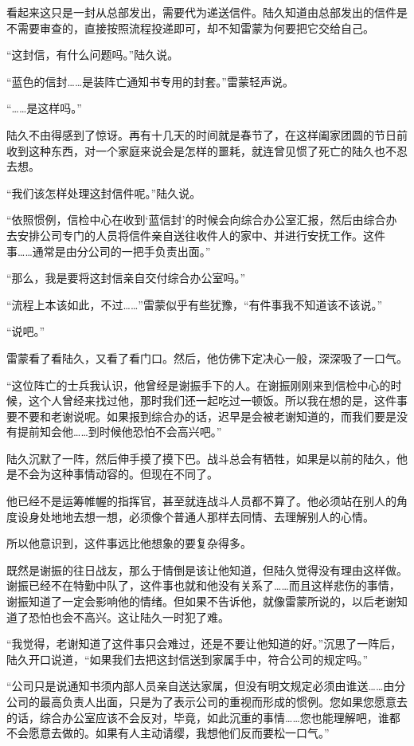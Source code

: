 看起来这只是一封从总部发出，需要代为递送信件。陆久知道由总部发出的信件是不需要审查的，直接按照流程投递即可，却不知雷蒙为何要把它交给自己。

“这封信，有什么问题吗。”陆久说。

“蓝色的信封……是装阵亡通知书专用的封套。”雷蒙轻声说。

“……是这样吗。”

陆久不由得感到了惊讶。再有十几天的时间就是春节了，在这样阖家团圆的节日前收到这种东西，对一个家庭来说会是怎样的噩耗，就连曾见惯了死亡的陆久也不忍去想。

“我们该怎样处理这封信件呢。”陆久说。

“依照惯例，信检中心在收到‘蓝信封’的时候会向综合办公室汇报，然后由综合办去安排公司专门的人员将信件亲自送往收件人的家中、并进行安抚工作。这件事……通常是由分公司的一把手负责出面。”

“那么，我是要将这封信亲自交付综合办公室吗。”

“流程上本该如此，不过……”雷蒙似乎有些犹豫，“有件事我不知道该不该说。”

“说吧。”

雷蒙看了看陆久，又看了看门口。然后，他仿佛下定决心一般，深深吸了一口气。

“这位阵亡的士兵我认识，他曾经是谢振手下的人。在谢振刚刚来到信检中心的时候，这个人曾经来找过他，那时我们还一起吃过一顿饭。所以我在想的是，这件事要不要和老谢说呢。如果报到综合办的话，迟早是会被老谢知道的，而我们要是没有提前知会他……到时候他恐怕不会高兴吧。”

陆久沉默了一阵，然后伸手摸了摸下巴。战斗总会有牺牲，如果是以前的陆久，他是不会为这种事情动容的。但现在不同了。

他已经不是运筹帷幄的指挥官，甚至就连战斗人员都不算了。他必须站在别人的角度设身处地地去想一想，必须像个普通人那样去同情、去理解别人的心情。

所以他意识到，这件事远比他想象的要复杂得多。

既然是谢振的往日战友，那么于情倒是该让他知道，但陆久觉得没有理由这样做。谢振已经不在特勤中队了，这件事也就和他没有关系了……而且这样悲伤的事情，谢振知道了一定会影响他的情绪。但如果不告诉他，就像雷蒙所说的，以后老谢知道了恐怕也会不高兴。这让陆久一时犯了难。

“我觉得，老谢知道了这件事只会难过，还是不要让他知道的好。”沉思了一阵后，陆久开口说道，“如果我们去把这封信送到家属手中，符合公司的规定吗。”

“公司只是说通知书须内部人员亲自送达家属，但没有明文规定必须由谁送……由分公司的最高负责人出面，只是为了表示公司的重视而形成的惯例。您如果您愿意去的话，综合办公室应该不会反对，毕竟，如此沉重的事情……您也能理解吧，谁都不会愿意去做的。如果有人主动请缨，我想他们反而要松一口气。”

